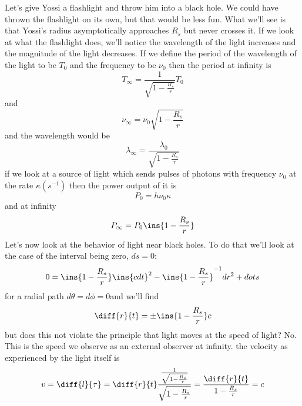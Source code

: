 Let's give Yossi a flashlight and throw him into a black hole. We could have thrown the flashlight on its own, but that would be less fun. What we'll see is that Yossi's radius asymptotically approaches \(R_s\) but never crosses it. If we look at what the flashlight does, we'll notice the wavelength of the light increases and the magnitude of the light decreases. If we define the period of the wavelength of the light to be \(T_0\) and the frequency to be \(\nu_0\) then the period at infinity is
\begin{equation}
    T_\infty = \frac{1}{\sqrt{1-\frac{R_s}{r}}}T_0
\end{equation}
and
\begin{equation}
    \nu_\infty = \nu_0\sqrt{1-\frac{R_s}{r}}
\end{equation}
and the wavelength would be
\begin{equation}
    \lambda_\infty = \frac{\lambda_0}{\sqrt{1-\frac{R_s}{r}}}
\end{equation}
if we look at a source of light which sends pulses of photons with frequency \(\nu_0\) at the rate \(\kappa (s^{-1})\) then the power output of it is
\begin{equation}
    P_0 = h\nu_0\kappa
\end{equation}
and at infinity
\begin{equation}
    P_\infty = P_0\ins{1-\frac{R_s}{r}}
\end{equation}
Let's now look at the behavior of light near black holes. To do that we'll look at the case of the interval being zero, \(ds = 0\):
\begin{equation}
    0 = \ins{1-\frac{R_s}{r}}\ins{cdt}^2 - \ins{1-\frac{R_s}{r}}^{-1}dr^2+dots
\end{equation}
for a radial path \(d\theta = d\phi = 0\)and we'll find
\begin{equation}
    \diff{r}{t} = \pm \ins{1-\frac{R_s}{r}}c
\end{equation}
but does this not violate the principle that light moves at the speed of light? No. This is the speed we observe as an external observer at infinity. the velocity as experienced by the light itself is
\begin{equation}
    v = \diff{l}{\tau} = \diff{r}{t}\frac{\frac{1}{\sqrt{1-\frac{R_s}{r}}}}{\sqrt{1-\frac{R_s}{r}}} = \frac{\diff{r}{t}}{1-\frac{R_s}{r}} = c
\end{equation}
